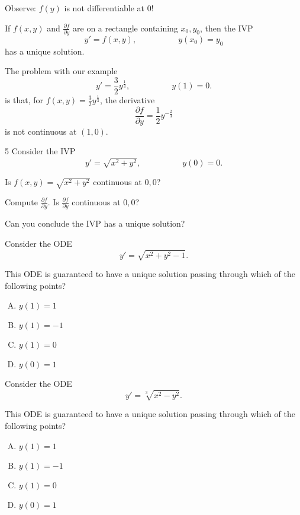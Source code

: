 \begin{applicationActivities}
\begin{observation}
\vfill
Observe: \(f(y)\) is not differentiable at \(0\)!
\end{observation}

\begin{observation}
If \(f(x,y)\) and \(\frac{\partial f}{\partial y}\) are  on a rectangle containing \(x_0,y_0\), then the IVP
\[ y'=f(x,y), \hspace{5em} y(x_0)=y_0\]
has a unique solution.

\vfill
The problem with our example \[y'=\frac{3}{2}y^\frac{1}{3}, \hspace{5em} y(1)=0.\]
 is that, for \(f(x,y)=\frac{3}{2} y^\frac{1}{3}\), the derivative \[\frac{\partial f}{\partial y} = \frac{1}{2} y^{-\frac{2}{3}}\] is not continuous at \((1,0)\).
\end{observation}

\begin{activity} {5}
Consider the IVP
\[ y'= \sqrt{x^2+y^2}, \hspace{5em} y(0)=0 .\]

\begin{subactivity}
Is \(f(x,y)=\sqrt{x^2+y^2}\) continuous at \(0,0\)?
\end{subactivity}
\begin{subactivity}
Compute \(\frac{\partial f}{\partial y}\).  Is \(\frac{\partial f}{\partial y}\) continuous at \(0,0\)?
\end{subactivity}
\begin{subactivity}
Can you conclude the IVP has a unique solution?
\end{subactivity}
\end{activity}

\begin{activity}{10}
Consider the ODE 
\[ y'= \sqrt{x^2+y^2-1}.\]

This ODE is guaranteed to have a unique solution passing through which of the following points?
\begin{enumerate}[(A)]
\item \(y(1)=1\) 
\item \(y(1)=-1\) 
\item \(y(1)=0\) 
\item \(y(0)=1\) 
\end{enumerate}
\end{activity}

\begin{activity}{10}
Consider the ODE 
\[ y'= \sqrt[3]{x^2-y^2}.\]

This ODE is guaranteed to have a unique solution passing through which of the following points?
\begin{enumerate}[(A)]
\item \(y(1)=1\) 
\item \(y(1)=-1\) 
\item \(y(1)=0\) 
\item \(y(0)=1\) 
\end{enumerate}
\end{activity}



\end{applicationActivities}
